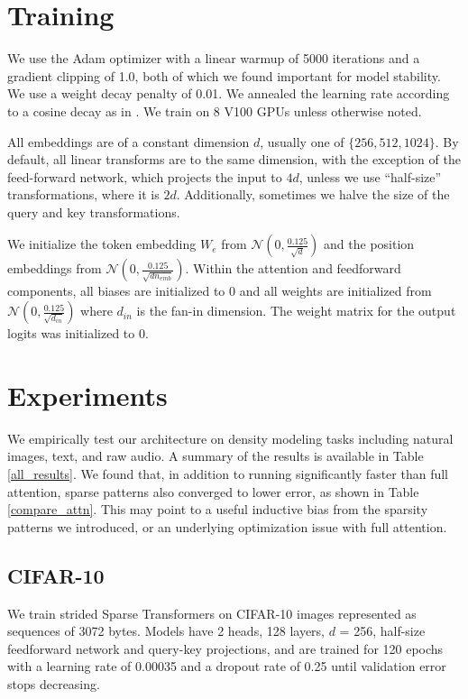 \section{Training}
We use the Adam optimizer with a linear warmup of 5000 iterations and a gradient clipping of 1.0, both of which we found important for model stability. We use a weight decay penalty of 0.01. We annealed the learning rate according to a cosine decay as in \cite{radford2018}. We train on 8 V100 GPUs unless otherwise noted.

All embeddings are of a constant dimension $d$, usually one of $\{256, 512, 1024\}$. By default, all linear transforms are to the same dimension, with the exception of the feed-forward network, which projects the input to $4d$, unless we use ``half-size'' transformations, where it is $2d$. Additionally, sometimes we halve the size of the query and key transformations.

We initialize the token embedding $W_e$ from $\mathcal{N}(0, \frac{0.125}{\sqrt{d}})$ and the position embeddings from $\mathcal{N}(0, \frac{0.125}{\sqrt{dn_{emb}}})$. Within the attention and feedforward components, all biases are initialized to 0 and all weights are initialized from $\mathcal{N}(0, \frac{0.125}{\sqrt{d_{in}}})$ where $d_{in}$ is the fan-in dimension. The weight matrix for the output logits was initialized to 0.

\section{Experiments}
We empirically test our architecture on density modeling tasks including natural images, text, and raw audio. A summary of the results is available in Table \ref{all_results}. We found that, in addition to running significantly faster than full attention, sparse patterns also converged to lower error, as shown in Table \ref{compare_attn}. This may point to a useful inductive bias from the sparsity patterns we introduced, or an underlying optimization issue with full attention.

\subsection{CIFAR-10}

We train strided Sparse Transformers on CIFAR-10 images represented as sequences of 3072 bytes. Models have 2 heads, 128 layers, $d$ = 256, half-size feedforward network and query-key projections, and are trained for 120 epochs with a learning rate of 0.00035 and a dropout rate of 0.25 until validation error stops decreasing.


